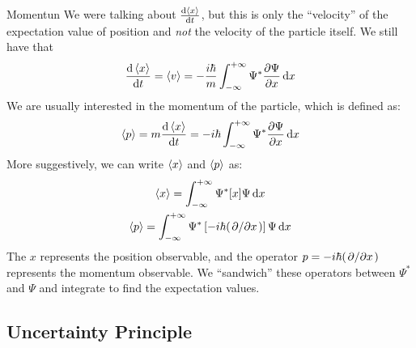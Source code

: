 \begin{frame}{Momentun}
	We were talking about $\dv{\ev x}{t}$, but this is only the ``velocity'' of the expectation value of position and \textit{not} the velocity of the particle itself. We still have that
	\[
		\dv{\ev x}{t} = \ev{v}  = -\frac{i\hbar}{m} \int_{-\infty}^{+\infty} \Psi^* \pdv{\Psi}{x} \dd{x}
	\]
	We are usually interested in the momentum of the particle, which is defined as:
	\begin{equation*}
		\ev p = m \dv{\ev x}{t} = -i\hbar \int_{-\infty}^{+\infty} \Psi^* \pdv{\Psi}{x} \dd{x}
	\end{equation*}
	More suggestively, we can write $\ev x$ and $\ev p$ as:
	\begin{gather*}
		\ev x =  \int_{-\infty}^{+\infty} \Psi^* [x] \Psi \dd{x}\\
		\ev p = \int_{-\infty}^{+\infty} \Psi^* \left[-i\hbar (\pdv*{x}) \right] \Psi \dd{x}
	\end{gather*}
	The $x$ represents the position observable, and the operator $ p = -i\hbar (\pdv*{x})$ represents the momentum observable. We ``sandwich'' these operators between $\Psi^*$ and $\Psi$ and integrate to find the expectation values.
\end{frame}


\subsection{Uncertainty Principle}

